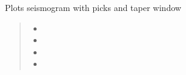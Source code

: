 \documentclass[letterpaper,10pt,english]{sphinxmanual}
\begin{document}
\begin{fulllineitems}
\begin{fulllineitems}
\begin{quote}
\begin{description}
\begin{itemize}
\end{itemize}

\end{description}\end{quote}

\end{fulllineitems}


\begin{fulllineitems}
\label{\detokenize{api_support:amw.mw.plot.PlotMw.plot_seismogram}}
\pysigstartsignatures
{}
\pysigstopsignatures
\sphinxAtStartPar
Plots seismogram with picks and taper window
\begin{quote}\begin{description}
\begin{itemize}
\item {} 
\sphinxAtStartPar
{}

\item {} 
\sphinxAtStartPar
{}

\item {} 
\sphinxAtStartPar
{}

\item {} 
\sphinxAtStartPar
{}

\end{itemize}

\end{description}\end{quote}

\end{fulllineitems}



\end{fulllineitems}
\end{document}
